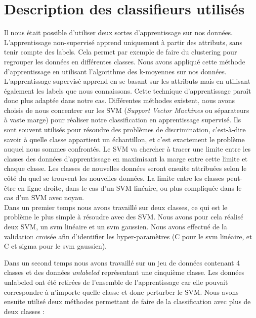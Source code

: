 \section{Description des classifieurs utilisés}

	Il nous était possible d'utiliser deux sortes d'apprentissage sur nos données. L'apprentissage non-supervisé apprend uniquement à partir des attributs, sans tenir compte des labels. Cela permet par exemple de faire du clustering pour regrouper les données en différentes classes. Nous avons appliqué cette méthode d'apprentissage en utilisant l'algorithme des k-moyennes sur nos données.\\

	L'apprentissage supervisé apprend en se basant sur les attributs mais en utilisant également les labels que nous connaissons. Cette technique d'apprentissage paraît donc plus adaptée dans notre cas. Différentes méthodes existent, nous avons choisis de nous concentrer sur les SVM (\emph{Support Vector Machines} ou séparateurs à vaste marge) pour réaliser notre classification en apprentissage supervisé. Ils sont souvent utilisés pour résoudre des problèmes de discrimination, c'est-à-dire savoir à quelle classe appartient un échantillon, et c'est exactement le problème auquel nous sommes confrontés. Le SVM va chercher à tracer une limite entre les classes des données d'apprentissage en maximisant la marge entre cette limite et chaque classe. Les classes de nouvelles données seront ensuite attribuées selon le côté du quel se trouvent les nouvelles données. La limite entre les classes peut-être en ligne droite, dans le cas d'un SVM linéaire, ou plus compliquée dans le cas d'un SVM avec noyau.\\

	Dans un premier temps nous avons travaillé sur deux classes, ce qui est le problème le plus simple à résoudre avec des SVM. Nous avons pour cela réalisé deux SVM, un svm linéaire et un svm gaussien. Nous avons effectué de la validation croisée afin d'identifier les hyper-paramètres (C pour le svm linéaire, et C et sigma pour le svm gaussien).

	Dans un second temps nous avons travaillé sur un jeu de données contenant 4 classes et des données \emph{unlabeled} représentant une cinquième classe. Les données unlabeled ont été retirées de l'ensemble de l'apprentissage car elle pouvait correspondre à n'importe quelle classe et donc perturber le SVM.
	Nous avons ensuite utilisé deux méthodes permettant de faire de la classification avec plus de deux classes : 

